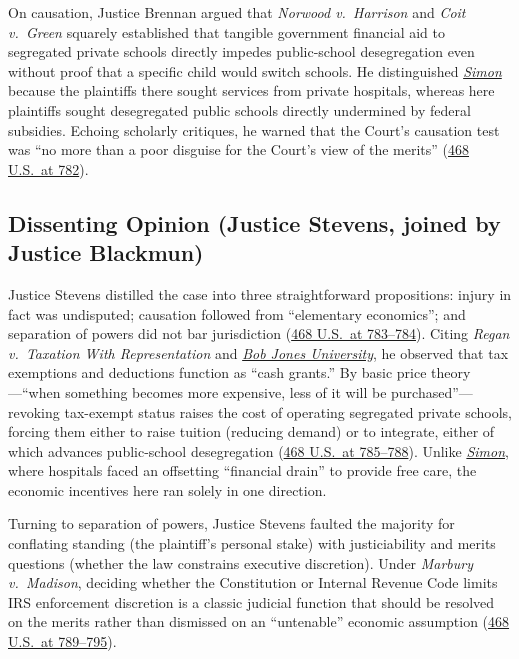 \documentclass[12pt]{article}
\begin{document}
On causation, Justice Brennan argued that \textit{Norwood v.\ Harrison} and \textit{Coit v.\ Green} squarely established that tangible government financial aid to segregated private schools directly impedes public-school desegregation even without proof that a specific child would switch schools. He distinguished \href{https://supreme.justia.com/cases/federal/us/426/26/}{\textit{Simon}} because the plaintiffs there sought services from private hospitals, whereas here plaintiffs sought desegregated public schools directly undermined by federal subsidies. Echoing scholarly critiques, he warned that the Court's causation test was ``no more than a poor disguise for the Court's view of the merits'' (\href{https://supreme.justia.com/cases/federal/us/468/737/}{468 U.S.\ at 782}).

\subsection{Dissenting Opinion (Justice Stevens, joined by Justice Blackmun)}
Justice Stevens distilled the case into three straightforward propositions: injury in fact was undisputed; causation followed from ``elementary economics''; and separation of powers did not bar jurisdiction (\href{https://supreme.justia.com/cases/federal/us/468/737/}{468 U.S.\ at 783--784}). Citing \textit{Regan v.\ Taxation With Representation} and \href{https://supreme.justia.com/cases/federal/us/461/574/}{\textit{Bob Jones University}}, he observed that tax exemptions and deductions function as ``cash grants.'' By basic price theory---``when something becomes more expensive, less of it will be purchased''---revoking tax-exempt status raises the cost of operating segregated private schools, forcing them either to raise tuition (reducing demand) or to integrate, either of which advances public-school desegregation (\href{https://supreme.justia.com/cases/federal/us/468/737/}{468 U.S.\ at 785--788}). Unlike \href{https://supreme.justia.com/cases/federal/us/426/26/}{\textit{Simon}}, where hospitals faced an offsetting ``financial drain'' to provide free care, the economic incentives here ran solely in one direction.

Turning to separation of powers, Justice Stevens faulted the majority for conflating standing (the plaintiff's personal stake) with justiciability and merits questions (whether the law constrains executive discretion). Under \textit{Marbury v.\ Madison}, deciding whether the Constitution or Internal Revenue Code limits IRS enforcement discretion is a classic judicial function that should be resolved on the merits rather than dismissed on an ``untenable'' economic assumption (\href{https://supreme.justia.com/cases/federal/us/468/737/}{468 U.S.\ at 789--795}).
\end{document}
